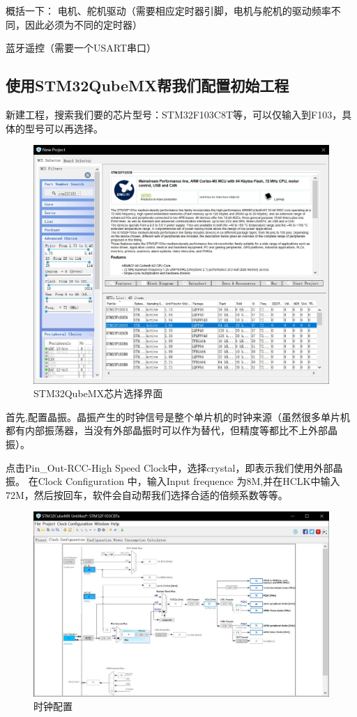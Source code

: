 \documentclass{article}
\begin{document}
概括一下：
电机、舵机驱动（需要相应定时器引脚，电机与舵机的驱动频率不同，因此必须为不同的定时器）

蓝牙遥控（需要一个USART串口）

\subsection{使用STM32QubeMX帮我们配置初始工程}
新建工程，搜索我们要的芯片型号：STM32F103C8T等，可以仅输入到F103，具体的型号可以再选择。
\begin{figure}[ht]
	\centering
	\includegraphics[scale=0.3]{Qube界面.jpg}
	\caption{STM32QubeMX芯片选择界面}
	\label{fig:label}
\end{figure}

首先,配置晶振。晶振产生的时钟信号是整个单片机的时钟来源（虽然很多单片机都有内部振荡器，当没有外部晶振时可以作为替代，但精度等都比不上外部晶振）。

点击Pin\_Out-RCC-High Speed Clock中，选择crystal，即表示我们使用外部晶振。
在Clock Configuration 中，输入Input frequence 为8M,并在HCLK中输入72M，然后按回车，软件会自动帮我们选择合适的倍频系数等等。

\begin{figure}[ht]
	\centering
	\includegraphics[scale=0.3]{时钟配置.jpg}
	\caption{时钟配置}
	\label{fig:label}
\end{figure}
\end{document}
